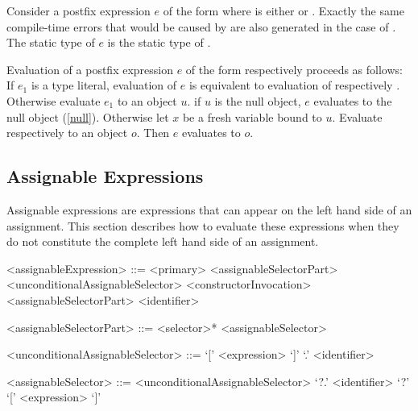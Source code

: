 \documentclass[makeidx]{article}
\begin{document}
{\LMHash{}%
Consider a postfix expression $e$ of the form 
where \op{} is either \lit{++} or \lit{-{}-}.
Exactly the same compile-time errors that would be caused by 
are also generated in the case of .
The static type of $e$ is the static type of .

\LMHash{}%
Evaluation of a postfix expression $e$
of the form  respectively 
proceeds as follows:
If $e_1$ is a type literal, evaluation of $e$ is equivalent to
evaluation of  respectively .
Otherwise evaluate $e_1$ to an object $u$.
if $u$ is the null object, $e$ evaluates to the null object (\ref{null}).
Otherwise let $x$ be a fresh variable bound to $u$.
Evaluate  respectively  to an object $o$.
Then $e$ evaluates to $o$.
\EndCase


\subsection{Assignable Expressions}

\LMHash{}%
Assignable expressions are expressions that can appear on the left hand side of an assignment.
This section describes how to evaluate these expressions when they do not constitute the complete left hand side of an assignment.


\begin{grammar}
<assignableExpression> ::= <primary> <assignableSelectorPart>
  \alt \SUPER{} <unconditionalAssignableSelector>
  \alt <constructorInvocation> <assignableSelectorPart>
  \alt <identifier>

<assignableSelectorPart> ::= <selector>* <assignableSelector>

<unconditionalAssignableSelector> ::= `[' <expression> `]'
  \alt `.' <identifier>

<assignableSelector> ::= <unconditionalAssignableSelector>
  \alt `?.' <identifier>
  \alt `?' `[' <expression> `]'

\end{grammar}

}
\end{document}
